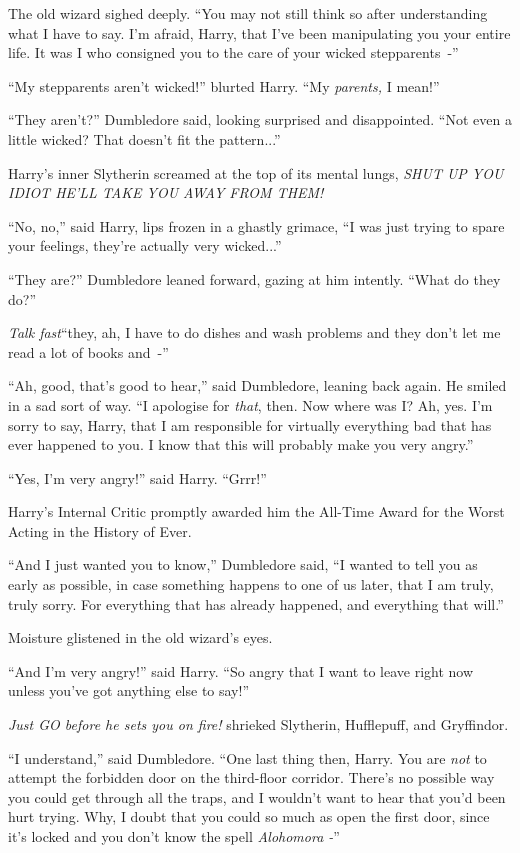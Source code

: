 The old wizard sighed deeply. ``You may not still think so after understanding what I have to say. I'm afraid, Harry, that I've been manipulating you your entire life. It was I who consigned you to the care of your wicked stepparents~-''

``My stepparents aren't wicked!'' blurted Harry. ``My \emph{parents,} I mean!''

``They aren't?'' Dumbledore said, looking surprised and disappointed. ``Not even a little wicked? That doesn't fit the pattern...''

Harry's inner Slytherin screamed at the top of its mental lungs, \emph{SHUT UP YOU IDIOT HE'LL TAKE YOU AWAY FROM THEM!}

``No, no,'' said Harry, lips frozen in a ghastly grimace, ``I was just trying to spare your feelings, they're actually very wicked...''

``They are?'' Dumbledore leaned forward, gazing at him intently. ``What do they do?''

\emph{Talk fast}``they, ah, I have to do dishes and wash problems and they don't let me read a lot of books and~-''

``Ah, good, that's good to hear,'' said Dumbledore, leaning back again. He smiled in a sad sort of way. ``I apologise for \emph{that}, then. Now where was I? Ah, yes. I'm sorry to say, Harry, that I am responsible for virtually everything bad that has ever happened to you. I know that this will probably make you very angry.''

``Yes, I'm very angry!'' said Harry. ``Grrr!''

Harry's Internal Critic promptly awarded him the All-Time Award for the Worst Acting in the History of Ever.

``And I just wanted you to know,'' Dumbledore said, ``I wanted to tell you as early as possible, in case something happens to one of us later, that I am truly, truly sorry. For everything that has already happened, and everything that will.''

Moisture glistened in the old wizard's eyes.

``And I'm very angry!'' said Harry. ``So angry that I want to leave right now unless you've got anything else to say!''

\emph{Just GO before he sets you on fire!} shrieked Slytherin, Hufflepuff, and Gryffindor.

``I understand,'' said Dumbledore. ``One last thing then, Harry. You are \emph{not} to attempt the forbidden door on the third-floor corridor. There's no possible way you could get through all the traps, and I wouldn't want to hear that you'd been hurt trying. Why, I doubt that you could so much as open the first door, since it's locked and you don't know the spell \emph{Alohomora -}''

